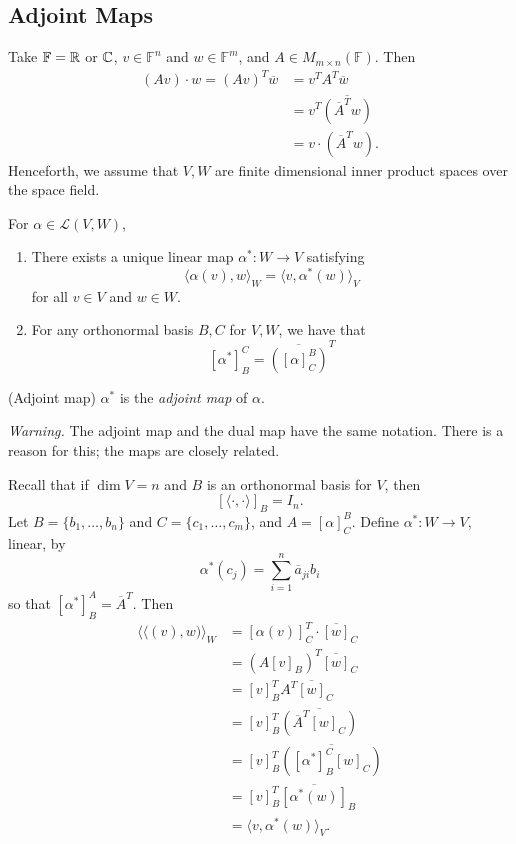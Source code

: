 \documentclass{article}
\newcommand{\F}{\mathbb{F}}
\begin{document}
\subsection{Adjoint Maps}
Take $ \F=\R $ or $ \mathbb{C} $, $ v\in \F^n $ and $ w\in \F^m $, and $ A\in M_{m\times n}(\F) $. Then
\begin{align*}
	(Av)\cdot w=(Av)^T\overline{w} &= v^TA^T\overline{w}\\
				    &=v^T\overline{(\overline{A}^Tw)}\\
				    &=v\cdot (\overline{A}^Tw).
\end{align*}
Henceforth, we assume that $ V,W $ are finite dimensional inner product spaces over the space field.
\begin{theorem}
  For $ \alpha\in\mathcal L(V,W) $,
  \begin{enumerate}
	  \item There exists a unique linear map $ \alpha^*:W\to V $ satisfying
		  \[
			  \langle \alpha(v),w\rangle_W=\langle v,\alpha^*(w)\rangle_V\tag{\star}
		  \]
		  for all $ v\in V $ and $ w\in W $.
	  \item For any orthonormal basis $ B,C $ for $ V,W $, we have that
		  \[
			  [\alpha^*]^C_B=\overline{([\alpha]_C^B)}^T
		  \]
  \end{enumerate}
\end{theorem}
\begin{definition}
	(Adjoint map) $ \alpha^* $ is the \textit{adjoint map} of $ \alpha $.
\end{definition}
\textit{Warning.} The adjoint map and the dual map have the same notation. There is a reason for this; the maps are closely related.\par
\pf Recall that if $ \dim V=n $ and $ B $ is an orthonormal basis for $ V $, then
\[
	[\langle\cdot,\cdot\rangle]_B=I_n.
\]
Let $ B=\{b_1,\dots, b_n\} $ and $ C=\{c_1,\dots, c_m\} $, and $ A=[\alpha]^B_C $. Define $ \alpha^*: W\to V $, linear, by
\[
	\alpha^*(c_j)=\sum_{i=1}^n\overline{a}_{ji}b_i
\]
so that $ [\alpha^*]_B^A=\overline A^T $. Then
\begin{align*}
	\langle \langle(v),w)\rangle_W&=[\alpha(v)]_C^T\cdot \overline{[w]}_C\\
				      &=(A[v]_B)^T\overline{[w]}_C\\
				      &=[v]^T_BA^T\overline{[w]}_C\\
				      &=[v]^T_B\overline{(\overline A^T[w]_C)}\\
				      &=[v]_B^T\overline{([\alpha^*]_B^C[w]_C)}\\
				      &=[v]^T_B\overline{[\alpha^*(w)]}_B\\
				      &=\langle v,\alpha^*(w)\rangle_V.
\end{align*}
\end{document}
